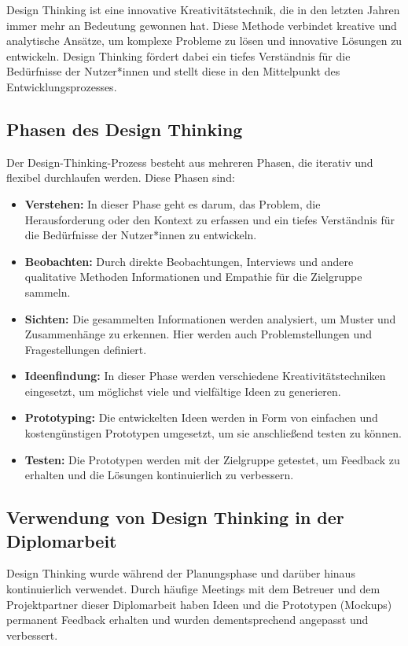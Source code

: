     Design Thinking ist eine innovative Kreativitätstechnik, die in den letzten Jahren immer mehr an Bedeutung gewonnen hat. 
    Diese Methode verbindet kreative und analytische Ansätze, um komplexe Probleme zu lösen und innovative Lösungen zu entwickeln. 
    Design Thinking fördert dabei ein tiefes Verständnis für die Bedürfnisse der Nutzer*innen und stellt diese in den Mittelpunkt des Entwicklungsprozesses. 

   
    \subsection{Phasen des Design Thinking}

    Der Design-Thinking-Prozess besteht aus mehreren Phasen, die iterativ und flexibel durchlaufen werden. Diese Phasen sind:

    \begin{itemize}
        \item \textbf{Verstehen:} In dieser Phase geht es darum, das Problem, die Herausforderung oder den Kontext zu erfassen und ein tiefes Verständnis für die Bedürfnisse der Nutzer*innen zu entwickeln.
        \item \textbf{Beobachten:} Durch direkte Beobachtungen, Interviews und andere qualitative Methoden Informationen und Empathie für die Zielgruppe sammeln.
        \item \textbf{Sichten:} Die gesammelten Informationen werden analysiert, um Muster und Zusammenhänge zu erkennen. Hier werden auch Problemstellungen und Fragestellungen definiert.
        \item \textbf{Ideenfindung:} In dieser Phase werden verschiedene Kreativitätstechniken eingesetzt, um möglichst viele und vielfältige Ideen zu generieren.
        \item \textbf{Prototyping:} Die entwickelten Ideen werden in Form von einfachen und kostengünstigen Prototypen umgesetzt, um sie anschließend testen zu können.
        \item \textbf{Testen:} Die Prototypen werden mit der Zielgruppe getestet, um Feedback zu erhalten und die Lösungen kontinuierlich zu verbessern.
    \end{itemize}
    

    \subsection{Verwendung von Design Thinking in der Diplomarbeit}
    Design Thinking wurde während der Planungsphase und darüber hinaus kontinuierlich verwendet. 
    Durch häufige Meetings mit dem Betreuer und dem Projektpartner dieser Diplomarbeit haben Ideen und die Prototypen (Mockups) permanent Feedback erhalten und wurden dementsprechend angepasst und verbessert.

